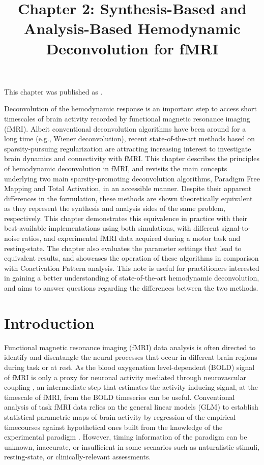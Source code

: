 \title{Chapter 2: Synthesis-Based and Analysis-Based Hemodynamic Deconvolution for fMRI}
\label{cha:synthesis_analysis}

This chapter was published as \cite{Urunuela2023HemodynamicDeconvolutionDemystified}.

Deconvolution of the hemodynamic response is an important step to access short
timescales of brain activity recorded by functional magnetic resonance imaging
(fMRI). Albeit conventional deconvolution algorithms have been around for a long
time (e.g., Wiener deconvolution), recent state-of-the-art methods based on
sparsity-pursuing regularization are attracting increasing interest to
investigate brain dynamics and connectivity with fMRI. This chapter describes
the principles of hemodynamic deconvolution in fMRI, and revisits the main
concepts underlying two main sparsity-promoting deconvolution algorithms,
Paradigm Free Mapping and Total Activation, in an accessible manner. Despite their
apparent differences in the formulation, these methods are shown theoretically
equivalent as they represent the synthesis and analysis sides of the same
problem, respectively. This chapter demonstrates this equivalence in practice
with their best-available implementations using both simulations, with different
signal-to-noise ratios, and experimental fMRI data acquired during a motor task
and resting-state. The chapter also evaluates the parameter settings that lead
to equivalent results, and showcases the operation of these algorithms in
comparison with Coactivation Pattern analysis. This note is useful for practitioners
interested in gaining a better understanding of state-of-the-art hemodynamic
deconvolution, and aims to answer questions regarding the differences between
the two methods.

\section{Introduction}
\label{sec:synthesis_introduction}

Functional magnetic resonance imaging (fMRI) data analysis is often directed to
identify and disentangle the neural processes that occur in different brain
regions during task or at rest. As the blood oxygenation level-dependent (BOLD)
signal of fMRI \citep{Ogawa1990Brainmagneticresonance} is only a proxy for
neuronal activity mediated through neurovascular coupling
\citep{Logothetis2001Neurophysiologicalinvestigationbasis}, an intermediate step
that estimates the activity-inducing signal, at the timescale of fMRI, from the
BOLD timeseries can be useful. Conventional analysis of task fMRI data relies on
the general linear models (GLM) to establish statistical parametric maps of
brain activity by regression of the empirical timecourses against hypothetical
ones built from the knowledge of the experimental paradigm
\citep{Boynton1996LinearSystemsAnalysis,Cohen1997ParametricAnalysisfMRI,Friston1998EventRelatedfMRI,Friston2008DEMvariationaltreatment}.
However, timing information of the paradigm can be unknown, inaccurate, or
insufficient in some scenarios such as naturalistic stimuli, resting-state, or
clinically-relevant assessments.


